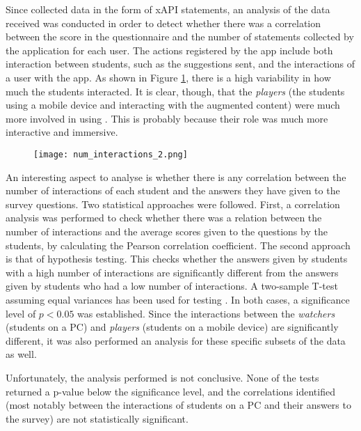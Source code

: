 Since \appname{} collected data in the form of xAPI statements, an analysis of the data received was conducted in order to detect whether there was a correlation between the score in the questionnaire and the number of statements collected by the application for each user.
The actions registered by the app include both interaction between students, such as the suggestions sent, and the interactions of a user with the app.
As shown in Figure \ref{fig:num_interactions}, there is a high variability in how much the students interacted. It is clear, though, that the \textit{players} (the students using a mobile device and interacting with the augmented content) were much more involved in using \appname{}. This is probably because their role was much more interactive and immersive.

\begin{figure}[htbp]
    \centering
    \texttt{[image: num\_interactions\_2.png]}
    \caption{\fontsize{10pt}{11pt}}
    \label{fig:num_interactions}
\end{figure}

An interesting aspect to analyse is whether there is any correlation between the number of interactions of each student and the answers they have given to the survey questions.
Two statistical approaches were followed.
First,  a correlation analysis was performed to check whether there was a relation between the number of interactions and the average scores given to the questions by the students, by calculating the Pearson correlation coefficient.
The second approach is that of hypothesis testing. This checks whether the answers given by students with a high number of interactions are significantly different from the answers given by students who had a low number of interactions.
A two-sample T-test assuming equal variances has been used for testing \citep{welch1947generalization}.
In both cases, a significance level of $p < 0.05$ was established.
Since the interactions between the \textit{watchers} (students on a PC) and \textit{players} (students on a mobile device) are significantly different, it was also performed an analysis for these specific subsets of the data as well.

Unfortunately, the analysis performed is not conclusive.
None of the tests returned a p-value below the significance level, and the correlations identified (most notably between the interactions of students on a PC and their answers to the survey) are not statistically significant.

